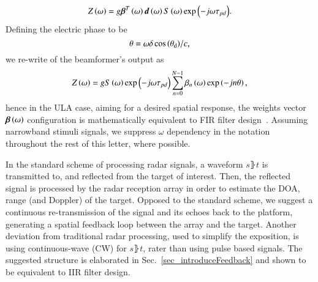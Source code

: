 $$ Z\rBrace{\omega} = g\vecnot{\beta}^{T}\rBrace{\omega}\vecnot{d}\rBrace{\omega}\F{s}\rBrace{\omega}\exp{\rBrace{-j\omega\tau_{pd}}}.$$ 
Defining the electric phase to be
\begin{equation}\label{eq:thetaULA}
\theta=\omega{\delta\cos\Brack{\thetaD}}/{c},
\end{equation}
we re-write of the beamformer's output as 
\[
Z\rBrace{\omega} = g\F{s}\rBrace{\omega}\exp{\rBrace{-j\omega\tau_{pd}}}\sum_{n=0}^{N-1}\beta_{n}\rBrace{\omega}\exp\Brack{-jn\theta},
\]
hence in the ULA case, aiming for a desired spatial response, the weights vector $\boldsymbol{\beta}\left({\omega}\right)$ configuration is mathematically equivalent to FIR filter design~\cite{van1988beamforming}. 
\ifdefined\useOmega \else 
Assuming narrowband stimuli signals, we suppress $\omega$ dependency in the notation throughout the rest of this letter, where possible.
\fi
\par In the standard scheme of processing radar signals, a waveform $s\rBrace{t}$ is transmitted to, and reflected from the target of interest. Then, the reflected signal is processed by the radar reception array in order to estimate the DOA, range (and Doppler) of the target. 
Opposed to the standard scheme, we suggest a continuous re-transmission of the signal and its echoes back to the platform, generating a spatial feedback loop between the array and the target.
Another deviation from traditional radar processing, used to simplify the exposition, is using continuous-wave (CW) for $s\rBrace{t}$, rater than using pulse based signals. The suggested structure is elaborated in Sec.~\ref{sec_introduceFeedback} and shown to be equivalent to IIR filter design.